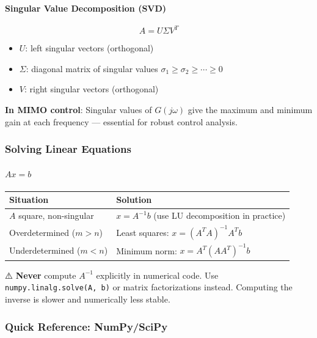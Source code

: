 \documentclass[11pt,a4paper]{book}
\begin{document}
\paragraph{Singular Value Decomposition (SVD)}

\[A = U \Sigma V^T\]

\begin{itemize}
\item $U$: left singular vectors (orthogonal)
\item $\Sigma$: diagonal matrix of singular values $\sigma_1 \geq \sigma_2 \geq \cdots \geq 0$
\item $V$: right singular vectors (orthogonal)
\end{itemize}

\textbf{In MIMO control}: Singular values of $G(j\omega)$ give the maximum and minimum gain at each frequency — essential for robust control analysis.

\medskip\noindent\hrulefill\medskip

\subsubsection{Solving Linear Equations}

\paragraph{$Ax = b$}

\begin{center}
\begin{tabular}{|l|l|}
\hline
Situation & Solution \\
\hline
$A$ square, non-singular & $x = A^{-1}b$ (use LU decomposition in practice) \\
Overdetermined ($m > n$) & Least squares: $x = (A^T A)^{-1} A^T b$ \\
Underdetermined ($m < n$) & Minimum norm: $x = A^T(AA^T)^{-1}b$ \\
\hline
\end{tabular}
\end{center}

⚠️ \textbf{Never} compute $A^{-1}$ explicitly in numerical code. Use \texttt{numpy.linalg.solve(A, b)} or matrix factorizations instead. Computing the inverse is slower and numerically less stable.

\medskip\noindent\hrulefill\medskip

\subsubsection{Quick Reference: NumPy/SciPy}
\end{document}

